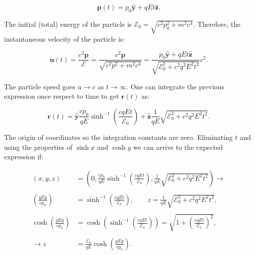 \begin{equation}
	\mathbf{p}(t)=p_{0} \hat{\mathbf{y}}+q E t \hat{\mathbf{z}}.
\end{equation}

The initial (total) energy of the particle is $\mathcal{E}_{0}=\sqrt{c^{2} p_{0}^{2}+m^{2} c^{4}}$. Therefore, the instantaneous velocity of the particle is:

\begin{equation}
	\mathbf{u}(t)=\frac{c^{2} \mathbf{p}}{\mathcal{E}}=\frac{c^{2} \mathbf{p}}{\sqrt{c^{2} p^{2}+m^{2} c^{4}}}=\frac{p_{0} \hat{\mathbf{y}}+q E t \hat{\mathbf{z}}}{\sqrt{\mathcal{E}_{0}^{2}+c^{2} q^{2} E^{2} t^{2}}} c^{2}.
\end{equation}

The particle speed goes $u \rightarrow c$ as $t \rightarrow \infty$. One can integrate the previous expression once respect to time to get $\mathbf{r}(t)$ as:

\begin{equation}
	\mathbf{r}(t)=\hat{\mathbf{y}} \frac{c p_{0}}{q E} \sinh ^{-1}\left(\frac{c q E t}{\mathcal{E}_{0}}\right)+\hat{\mathbf{z}} \frac{1}{q E} \sqrt{\mathcal{E}_{0}^{2}+c^{2} q^{2} E^{2} t^{2}} .
\end{equation}

The origin of coordinates so the integration constants are zero. Eliminating $t$ and using the properties of $\sinh x$ and $\cosh y$ we can arrive to the expected expression if:

\begin{equation}
	\begin{split}
		(x,y,z) &= \left(0, \frac{c p_{0}}{q E} \sinh ^{-1}\left(\frac{c q E t}{\mathcal{E}_{0}}\right),  \frac{1}{q E} \sqrt{\mathcal{E}_{0}^{2}+c^{2} q^{2} E^{2} t^{2}}\right) \rightarrow \\
		 &\\
		 \left(\frac{q E y}{c p_{0}}\right) &= \sinh ^{-1}\left(\frac{c q E t}{\mathcal{E}_{0}}\right), \quad \quad z =\frac{1}{q E} \sqrt{\mathcal{E}_{0}^{2}+c^{2} q^{2} E^{2} t^{2}}, \\
		 &\\
		 \cosh \left(\frac{q E y}{c p_{0}}\right) &= \cosh \left(\sinh ^{-1}\left(\frac{c q E t}{\mathcal{E}_{0}}\right)\right) = \sqrt{1 + \left(\frac{c q E t}{\mathcal{E}_{0}}\right)^{2}},\\
		 &\\
		\rightarrow z&=\frac{\mathcal{E}_{0}}{q E} \cosh \left(\frac{q E y}{c p_{0}}\right) .
	\end{split}
\end{equation}

